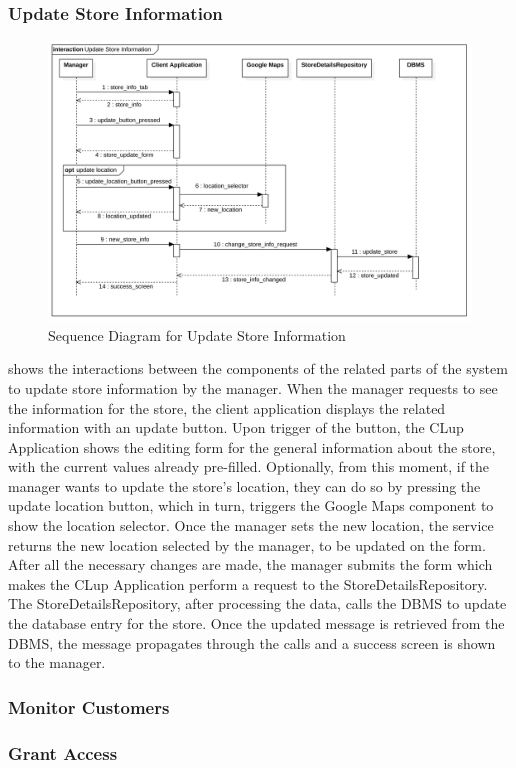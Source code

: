 \subsubsection{Update Store Information}
\begin{figure}[H]
    \centering
    \includegraphics[height=0.4\textwidth]{Images/SequenceDiagrams/UpdateStoreInformation.png}
    \caption{Sequence Diagram for Update Store Information}
    \label{fig:SDUpdateStoreInformation}
\end{figure}
 shows the interactions between the components of the related parts of the system to update store information by the manager.
When the manager requests to see the information for the store, the client application displays the related information with an update button.
Upon trigger of the button, the CLup Application shows the editing form for the general information about the store, with the current values already pre-filled.
Optionally, from this moment, if the manager wants to update the store's location, they can do so by pressing the update location button, which in turn, triggers the Google Maps component to show the location selector.
Once the manager sets the new location, the service returns the new location selected by the manager, to be updated on the form.
After all the necessary changes are made, the manager submits the form which makes the CLup Application perform a request to the StoreDetailsRepository.
The StoreDetailsRepository, after processing the data, calls the DBMS to update the database entry for the store.
Once the updated message is retrieved from the DBMS, the message propagates through the calls and a success screen is shown to the manager.
\subsubsection{Monitor Customers} %
\subsubsection{Grant Access} %
